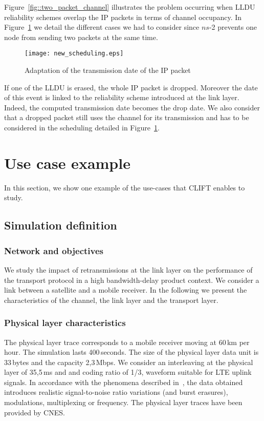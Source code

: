 \documentclass[conference,letterpaper]{IEEEtran}
\begin{document}
Figure~\ref{fig::two_packet_channel} illustrates the problem occurring when LLDU reliability schemes overlap the IP packets in terms of channel occupancy. In Figure~\ref{fig::new_scheduling} we detail the different cases we had to consider since $ns$-2 prevents one node from sending two packets at the same time.

\begin{figure}[h]
    \begin{center}
	\texttt{[image: new\_scheduling.eps]}
	\caption{Adaptation of the transmission date of the IP packet}
	\label{fig::new_scheduling}
    \end{center}
\end{figure}

If one of the LLDU is erased, the whole IP packet is dropped. Moreover the date of this event is linked to the reliability scheme introduced at the link layer. Indeed, the computed transmission date becomes the drop date. We also consider that a dropped packet still uses the channel for its transmission and has to be considered in the scheduling detailed in Figure~\ref{fig::new_scheduling}.

\section{Use case example}
\label{sec::illustration}

In this section, we show one example of the use-cases that CLIFT enables to study.
\subsection{Simulation definition}
\label{subsec::illustration_definition}

\subsubsection{Network and objectives}
We study the impact of retransmissions at the link layer on the performance of the transport protocol in a high bandwidth-delay product context. We consider a link between a satellite and a mobile receiver. In the following we present the characteristics of the channel, the link layer and the transport layer.

\subsubsection{Physical layer characteristics}
The physical layer trace corresponds to a mobile receiver moving at 60\,km per hour. The simulation lasts 400\,seconds. The size of the physical layer data unit is 33\,bytes and the capacity 2,3\,Mbps. We consider an interleaving at the physical layer of 35,5\,ms and and coding ratio of 1/3, waveform suitable for LTE uplink signals. In accordance with the phenomena described in~\cite{lms_state}, the data obtained introduces realistic signal-to-noise ratio variations (and burst erasures), modulations, multiplexing or frequency. The physical layer traces have been provided by CNES.
\end{document}
